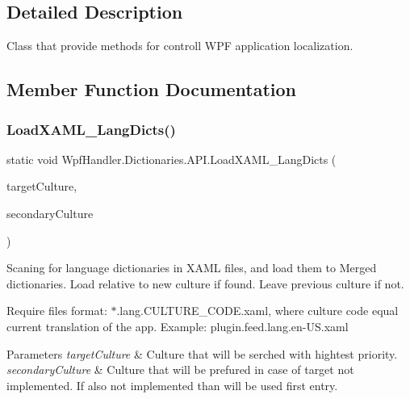 \subsection{Detailed Description}
Class that provide methods for controll W\+PF application localization. 



\subsection{Member Function Documentation}
\mbox{\label{class_wpf_handler_1_1_dictionaries_1_1_a_p_i_ad5c415a6377e871aff2020a9489815ff}} 
\subsubsection{\texorpdfstring{Load\+X\+A\+M\+L\+\_\+\+Lang\+Dicts()}{LoadXAML\_LangDicts()}}
{\footnotesize\ttfamily static void Wpf\+Handler.\+Dictionaries.\+A\+P\+I.\+Load\+X\+A\+M\+L\+\_\+\+Lang\+Dicts (\begin{DoxyParamCaption}\item[{Culture\+Info}]{target\+Culture,  }\item[{Culture\+Info}]{secondary\+Culture }\end{DoxyParamCaption})\hspace{0.3cm}{\ttfamily [static]}}



Scaning for language dictionaries in X\+A\+ML files, and load them to Merged dictionaries. Load relative to new culture if found. Leave previous culture if not. 

Require files format\+: $\ast$.lang.\+C\+U\+L\+T\+U\+R\+E\+\_\+\+C\+O\+D\+E.\+xaml, where culture code equal current translation of the app. Example\+: plugin.\+feed.\+lang.\+en-\/\+U\+S.\+xaml 


\begin{DoxyParams}{Parameters}
{\em target\+Culture} & Culture that will be serched with hightest priority.\\
\hline
{\em secondary\+Culture} & Culture that will be prefured in case of target not implemented. If also not implemented than will be used first entry.\\
\hline
\end{DoxyParams}
\mbox{\label{class_wpf_handler_1_1_dictionaries_1_1_a_p_i_ac9aafbe351f06f0c20de39508d3e8852}} 
